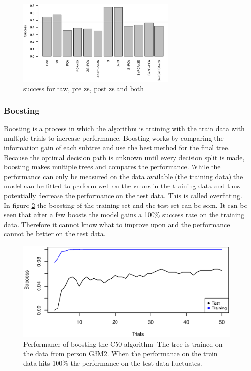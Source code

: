 \begin{figure}[H]
\centering
\includegraphics[width=0.7\textwidth]{graphics/tree_total_all}
\caption{success for raw, pre zs, post zs and both}
\label{fig:tree_total_all}
\end{figure}

\subsubsection{Boosting}
Boosting is a process in which the algorithm is training with the train data with multiple trials to increase performance.
Boosting works by comparing the information gain of each subtree and use the best method for the final tree.
Because the optimal decision path is unknown until every decision split is made, boosting makes multiple trees and compares the performance.
While the performance can only be measured on the data available (the training data) the model can be fitted to perform well on the errors in the training data and thus potentially decrease the performance on the test data.
This is called overfitting. 
In figure \ref{fig:tree_overfitting} the boosting of the training set and the test set can be seen.
It can be seen that after a few boosts the model gains a 100\% success rate on the training data.
Therefore it cannot know what to improve upon and the performance cannot be better on the test data.

\begin{figure}[H]
\includegraphics[width = \textwidth]{graphics/tree_boost_overfitting}
\caption[Boosting decision tree]{Performance of boosting the C50 algorithm. 
The tree is trained on the data from person G3M2. 
When the performance on the train data hits 100\% the performance on the test data fluctuates. }
\label{fig:tree_overfitting}
\end{figure}

